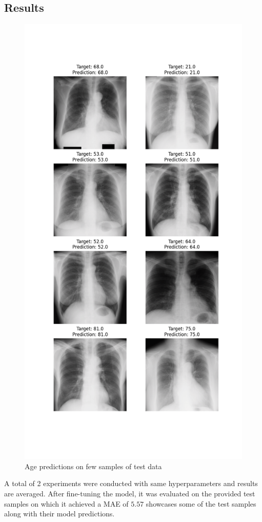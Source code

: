 \subsection{Results}

    \begin{figure}[!htbp]
        \centering
        \includegraphics[width=\linewidth]{../outputs/age/age1/test-results.png}
        \caption{Age predictions on few samples of test data}
        \label{fig:age-results}
    \end{figure} 

    A total of 2 experiments were conducted with same hyperparameters and results are averaged. After fine-tuning the model, it was evaluated on the provided test samples on which it achieved a MAE of $5.57$  showcases some of the test samples along with their model predictions.
